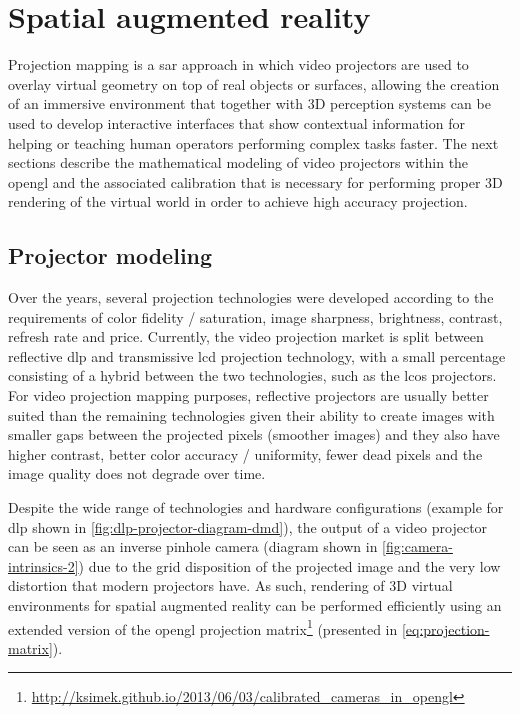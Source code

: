 \section{Spatial augmented reality}\label{sec:sar}

Projection mapping is a \gls{sar} \cite{Bimber2005} approach in which video projectors are used to overlay virtual geometry on top of real objects or surfaces, allowing the creation of an immersive environment that together with 3D perception systems can be used to develop interactive interfaces that show contextual information for helping or teaching human operators performing complex tasks faster. The next sections describe the mathematical modeling of video projectors within the \gls{opengl} and the associated calibration that is necessary for performing proper 3D rendering of the virtual world in order to achieve high accuracy projection.


\subsection{Projector modeling}\label{sec:projector-modeling}

Over the years, several projection technologies were developed according to the requirements of color fidelity / saturation, image sharpness, brightness, contrast, refresh rate and price. Currently, the video projection market is split between reflective \gls{dlp} and transmissive \gls{lcd} projection technology, with a small percentage consisting of a hybrid between the two technologies, such as the \gls{lcos} projectors. For video projection mapping purposes, reflective projectors are usually better suited than the remaining technologies given their ability to create images with smaller gaps between the projected pixels (smoother images) and they also have higher contrast, better color accuracy / uniformity, fewer dead pixels and the image quality does not degrade over time.

Despite the wide range of technologies and hardware configurations (example for \gls{dlp} shown in \cref{fig:dlp-projector-diagram-dmd}), the output of a video projector can be seen as an inverse pinhole camera (diagram shown in \cref{fig:camera-intrinsics-2}) due to the grid disposition of the projected image and the very low distortion that modern projectors have. As such, rendering of 3D virtual environments for spatial augmented reality can be performed efficiently using an extended version of the \gls{opengl} projection matrix\footnote{\url{http://ksimek.github.io/2013/06/03/calibrated\_cameras\_in\_opengl}} (presented in \cref{eq:projection-matrix}).

